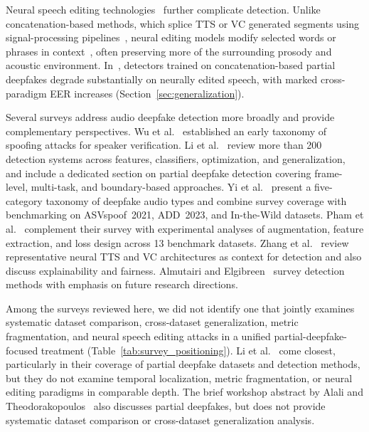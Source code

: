 \documentclass[journal]{IEEEtran}
\begin{document}
Neural speech editing technologies~\cite{peng2024voicecraft,wang2025ssrspeech,vyas2023audiobox} further complicate detection. Unlike concatenation-based methods, which splice TTS or VC generated segments using signal-processing pipelines~\cite{zhang2023partialspoof}, neural editing models modify selected words or phrases in context~\cite{kassmann2024speechediting}, often preserving more of the surrounding prosody and acoustic environment. In~\cite{zhang2025partialedit}, detectors trained on concatenation-based partial deepfakes degrade substantially on neurally edited speech, with marked cross-paradigm EER increases (Section~\ref{sec:generalization}).

Several surveys address audio deepfake detection more broadly and provide complementary perspectives. Wu et al.~\cite{wu2015spoofing} established an early taxonomy of spoofing attacks for speaker verification. Li et al.~\cite{li2025survey} review more than 200 detection systems across features, classifiers, optimization, and generalization, and include a dedicated section on partial deepfake detection covering frame-level, multi-task, and boundary-based approaches. Yi et al.~\cite{yi2023survey} present a five-category taxonomy of deepfake audio types and combine survey coverage with benchmarking on ASVspoof~2021, ADD~2023, and In-the-Wild datasets. Pham et al.~\cite{pham2025survey} complement their survey with experimental analyses of augmentation, feature extraction, and loss design across 13 benchmark datasets. Zhang et al.~\cite{zhang2025audiosurvey} review representative neural TTS and VC architectures as context for detection and also discuss explainability and fairness. Almutairi and Elgibreen~\cite{almutairi2022review} survey detection methods with emphasis on future research directions.

Among the surveys reviewed here, we did not identify one that jointly examines systematic dataset comparison, cross-dataset generalization, metric fragmentation, and neural speech editing attacks in a unified partial-deepfake-focused treatment (Table~\ref{tab:survey_positioning}). Li et al.~\cite{li2025survey} come closest, particularly in their coverage of partial deepfake datasets and detection methods, but they do not examine temporal localization, metric fragmentation, or neural editing paradigms in comparable depth. The brief workshop abstract by Alali and Theodorakopoulos~\cite{alali2024deepfakesurvey} also discusses partial deepfakes, but does not provide systematic dataset comparison or cross-dataset generalization analysis.
\end{document}

